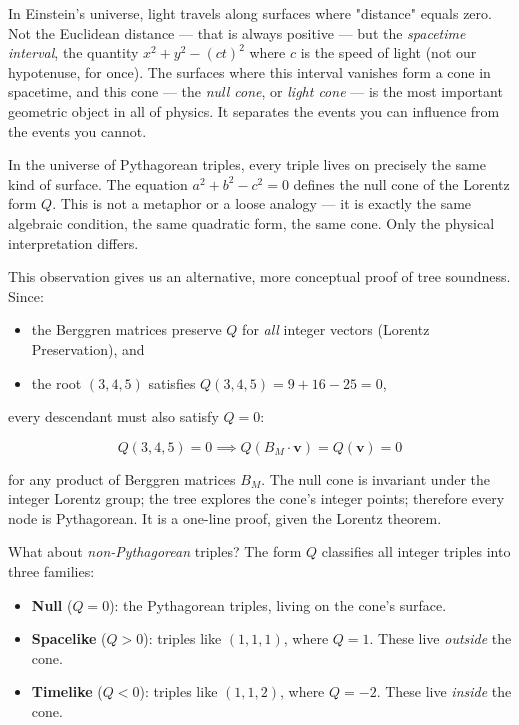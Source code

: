 \documentclass[11pt,twoside,openright]{book}
\theoremstyle{definition}
\theoremstyle{remark}
\begin{document}
In Einstein's universe, light travels along surfaces where "distance" equals zero. Not the Euclidean distance --- that is always positive --- but the \textit{spacetime interval}, the quantity $x^2 + y^2 - (ct)^2$ where $c$ is the speed of light (not our hypotenuse, for once). The surfaces where this interval vanishes form a cone in spacetime, and this cone --- the \textit{null cone}, or \textit{light cone} --- is the most important geometric object in all of physics. It separates the events you can influence from the events you cannot.

In the universe of Pythagorean triples, every triple lives on precisely the same kind of surface. The equation $a^2 + b^2 - c^2 = 0$ defines the null cone of the Lorentz form $Q$. This is not a metaphor or a loose analogy --- it is exactly the same algebraic condition, the same quadratic form, the same cone. Only the physical interpretation differs.

This observation gives us an alternative, more conceptual proof of tree soundness. Since:

\begin{itemize}
  \item the Berggren matrices preserve $Q$ for \textit{all} integer vectors (Lorentz Preservation), and
  \item the root $(3, 4, 5)$ satisfies $Q(3, 4, 5) = 9 + 16 - 25 = 0$,
\end{itemize}

every descendant must also satisfy $Q = 0$:

\[Q(3, 4, 5) = 0 \implies Q(B_M \cdot \mathbf{v}) = Q(\mathbf{v}) = 0\]

for any product of Berggren matrices $B_M$. The null cone is invariant under the integer Lorentz group; the tree explores the cone's integer points; therefore every node is Pythagorean. It is a one-line proof, given the Lorentz theorem.

What about \textit{non-Pythagorean} triples? The form $Q$ classifies all integer triples into three families:

\begin{itemize}
  \item \textbf{Null} ($Q = 0$): the Pythagorean triples, living on the cone's surface.
  \item \textbf{Spacelike} ($Q > 0$): triples like $(1, 1, 1)$, where $Q = 1$. These live \textit{outside} the cone.
  \item \textbf{Timelike} ($Q < 0$): triples like $(1, 1, 2)$, where $Q = -2$. These live \textit{inside} the cone.
\end{itemize}
\end{document}
